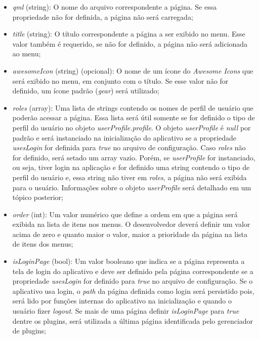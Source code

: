 \begin{itemize}
	\item \textit{qml} (string): O nome do arquivo correspondente a página. Se essa propriedade não for definida, a página não será carregada;

	\item \textit{title} (string): O título correspondente a página a ser exibido no menu. Esse valor também é requerido, se não for definido, a página não será adicionada ao menu;

	\item \textit{awesomeIcon} (string) (opcional): O nome de um ícone do \textit{Awesome Icons} que será exibido no menu, em conjunto com o título. Se esse valor não for definido, um ícone padrão (\textit{gear}) será utilizado;

	\item \textit{roles} (array): Uma lista de strings contendo os nomes de perfil de usuário que poderão acessar a página. Essa lista será útil somente se for definido o tipo de perfil do usuário no objeto \textit{userProfile.profile}. O objeto \textit{userProfile} é \textit{null} por padrão e será instanciado na inicialização do aplicativo se a propriedade \textit{usesLogin} for definida para \textit{true} no arquivo de configuração. Caso \textit{roles} não for definido, será setado um array vazio. Porém, se \textit{userProfile} for instanciado, ou seja, tiver login na aplicação e for definido uma string contendo o tipo de perfil do usuário e, essa string não tiver em \textit{roles}, a página não será exibida para o usuário. Informações sobre o objeto \textit{userProfile} será detalhado em um tópico posterior;

	\item \textit{order} (int): Um valor numérico que define a ordem em que a página será exibida na lista de itens nos menus. O desenvolvedor deverá definir um valor acima de zero e quanto maior o valor, maior a prioridade da página na lista de itens dos menus;

	\item \textit{isLoginPage} (bool): Um valor booleano que indica se a página representa a tela de login do aplicativo e deve ser definido pela página correspondente se a propriedade \textit{usesLogin} for definido para \textit{true} no arquivo de configuração. Se o aplicativo usa login, o \textit{path} da página definida como login será persistido pois, será lido por funções internas do aplicativo na inicialização e quando o usuário fizer \textit{logout}. Se mais de uma página definir \textit{isLoginPage} para \textit{true} dentre os plugins, será utilizada a última página identificada pelo gerenciador de plugins;


\end{itemize}
